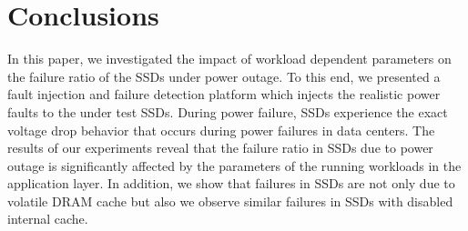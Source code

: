 \vspace{-1em}
\section{Conclusions}
\vspace{-0.6em}
\label{SEC:CONC}
In this paper, we investigated the impact of workload dependent parameters on the failure ratio of the SSDs under power outage. To this end, we presented a fault injection and failure detection platform which injects the realistic power faults to the under test SSDs. During power failure, SSDs experience the exact voltage drop behavior that occurs during power failures in data centers. The results of our experiments reveal that the failure ratio in SSDs due to power outage is significantly affected by the parameters of the running workloads in the application layer. In addition, we show that failures in SSDs are not only due to volatile DRAM cache but also we observe similar failures in SSDs with disabled internal cache.


